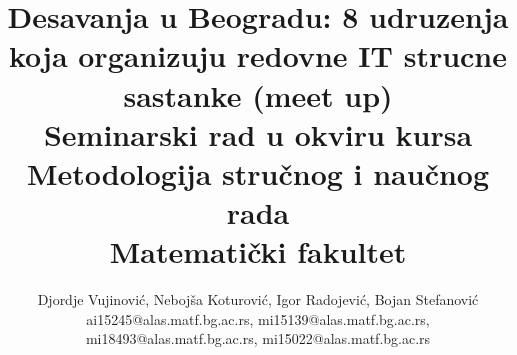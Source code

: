 \documentclass[a4paper]{article}
\begin{document}
\title{Desavanja u Beogradu: 8 udruzenja koja organizuju redovne IT strucne sastanke (meet up) \\ \small{Seminarski rad u okviru kursa\\Metodologija stručnog i naučnog rada\\ Matematički fakultet}}

\author{Djordje Vujinović, Nebojša Koturović, Igor Radojević, Bojan Stefanović\\ ai15245@alas.matf.bg.ac.rs, mi15139@alas.matf.bg.ac.rs, \\ mi18493@alas.matf.bg.ac.rs, mi15022@alas.matf.bg.ac.rs}


\maketitle
\end{document}
